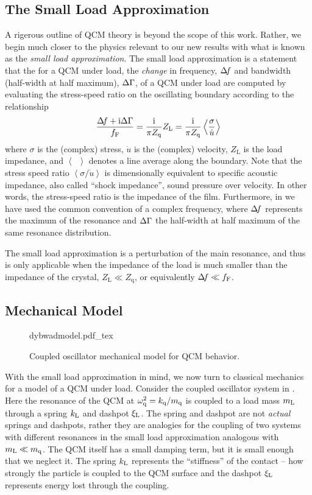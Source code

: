 \subsection{The Small Load Approximation}
A rigerous outline of QCM theory is beyond the scope of this work.  Rather,
we begin much closer to the physics relevant to our new results with what
is known as the \textit{small load approximation}.  The small load
approximation is a statement that the for a QCM under load, the
\textit{change} in frequency, $\Delta\!f$ and bandwidth (half-width at half
maximum), $\Delta\Gamma$, of a QCM under load are computed by evaluating the
stress-speed ratio on the oscillating boundary according to the
relationship
\begin{equation}
 \frac{\Delta\!f+{\mathrm{i}}\Delta\Gamma}{f_{\mathrm{F}}}=\frac{{\mathrm{i}}}{\pi Z_{\mathrm{q}}}Z_\mathrm{L} =\frac{{\mathrm{i}}}{\pi Z_{\mathrm{q}}}\left<\frac{\sigma}{\dot{u}}\right>
\label{eqn:comsolextract}
\end{equation}
where $\sigma$ is the (complex) stress, $\dot{u}$ is the (complex)
velocity, $Z_\mathrm{L}$ is the load impedance, and $\left<\enspace\right>$
denotes a line average along the boundary.  Note that the stress speed
ratio $\left<\sigma/\dot{u}\right>$ is dimensionally equivalent to specific
acoustic impedance, also called ``shock impedance'', sound pressure over
velocity.  In other words, the stress-speed ratio is the impedance of the
film.  Furthermore, in  we have used the
common convention of a complex frequency, where $\Delta\!f$ represents the
maximum of the resonance and $\Delta\Gamma$ the half-width at half maximum of the
same resonance distribution.

The small load approximation is a perturbation of the main resonance, and
thus is only applicable when the impedance of the load is much smaller than
the impedance of the crystal, $Z_\mathrm{L} \ll Z_\mathrm{q}$, or
equivalently $\Delta\!f \ll f_\mathrm{F}$.

\subsection{Mechanical Model}
\begin{figure}[ht]
 \centering
 {dybwadmodel.pdf_tex}
 \caption{Coupled oscillator mechanical model for QCM behavior.}
 \label{fig:mechanicalmodel}
\end{figure}

With the small load approximation in mind, we now turn to classical
mechanics for a model of a QCM under load.  Consider the coupled oscillator
system in .  Here the resonance of the QCM at
$\omega_\mathrm{q}^2=k_\mathrm{q}/m_\mathrm{q}$ is coupled to a load mass $m_\mathrm{L}$ through a spring $k_\mathrm{L}$
and dashpot $\xi_\mathrm{L}$.  The spring and dashpot are not \textit{actual} springs
and dashpots, rather they are analogies for the coupling of two systems
with different resonances in the small load approximation analogous with
$m_\mathrm{L}\ll m_\mathrm{q}$.  The QCM itself has a small damping term, but it is small
enough that we neglect it.  The spring $k_\mathrm{L}$ represents the ``stiffness''
of the contact -- how strongly the particle is coupled to the QCM surface
and the dashpot $\xi_\mathrm{L}$ represents energy lost through the coupling.  

